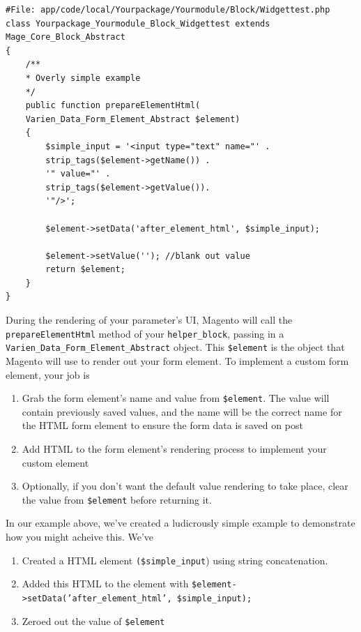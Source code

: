 \documentclass[oneside]{book}
\begin{document}
\begin{lstlisting}
#File: app/code/local/Yourpackage/Yourmodule/Block/Widgettest.php
class Yourpackage_Yourmodule_Block_Widgettest extends Mage_Core_Block_Abstract
{
    /**
    * Overly simple example
    */  
    public function prepareElementHtml(
    Varien_Data_Form_Element_Abstract $element)
    {
        $simple_input = '<input type="text" name="' . 
        strip_tags($element->getName()) . 
        '" value="' . 
        strip_tags($element->getValue()).
        '"/>';

        $element->setData('after_element_html', $simple_input);         

        $element->setValue(''); //blank out value
        return $element;
    }
}

\end{lstlisting}


During the rendering of your parameter's UI, Magento will call the  \footnotesize\texttt{prepareElementHtml} \normalsize  method of your \footnotesize\texttt{helper\_block}\normalsize, passing in a \footnotesize\texttt{Varien\_Data\_Form\_Element\_Abstract} \normalsize  object.  This \footnotesize\texttt{\$element} \normalsize  is the object that Magento will use to render out your form element.  To implement a custom form element, your job is

\begin{enumerate}
\item Grab the form element's name and value from \footnotesize\texttt{\$element}\normalsize. The value will contain previously saved values, and the name will be the correct name for the HTML form element to ensure the form data is saved on post
\item Add HTML to the form element's rendering process to implement your custom element
\item Optionally, if you don't want the default value rendering to take place, clear the value from \footnotesize\texttt{\$element} \normalsize  before returning it.
\end{enumerate}


In our example above, we've created a ludicrously simple example to demonstrate how you might acheive this. We've 

\begin{enumerate}
\item Created a HTML element \footnotesize\texttt{(\$simple\_input}\normalsize) using string concatenation.
\item Added this HTML to the element with \footnotesize\texttt{\$element-\textgreater setData('after\_element\_html', \$simple\_input);} \normalsize 
\item Zeroed out the value of \footnotesize\texttt{\$element} \normalsize 
\end{enumerate}
\end{document}
